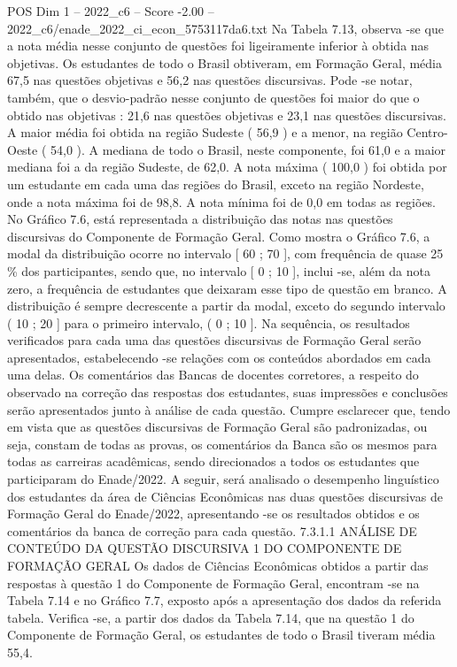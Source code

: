 \begin{textsample}{POS Dim 1 – 2022\_c6 – Score -2.00 – 2022\_c6/enade\_2022\_ci\_econ\_5753117da6.txt}
Na Tabela 7.13, observa -se que a nota média nesse conjunto de questões foi ligeiramente inferior à obtida nas objetivas.
Os estudantes de todo o Brasil obtiveram, em Formação Geral, média 67,5 nas questões objetivas e 56,2 nas questões discursivas.
Pode -se notar, também, que o desvio-padrão nesse conjunto de questões foi maior do que o obtido nas objetivas : 21,6 nas questões objetivas e 23,1 nas questões discursivas.
A maior média foi obtida na região Sudeste ( 56,9 ) e a menor, na região Centro-Oeste ( 54,0 ).
A mediana de todo o Brasil, neste componente, foi 61,0 e a maior mediana foi a da região Sudeste, de 62,0.
A nota máxima ( 100,0 ) foi obtida por um estudante em cada uma das regiões do Brasil, exceto na região Nordeste, onde a nota máxima foi de 98,8.
A nota mínima foi de 0,0 em todas as regiões.
No Gráfico 7.6, está representada a distribuição das notas nas questões discursivas do Componente de Formação Geral.
Como mostra o Gráfico 7.6, a modal da distribuição ocorre no intervalo [ 60 ; 70 ], com frequência de quase 25 \% dos participantes, sendo que, no intervalo [ 0 ; 10 ], inclui -se, além da nota zero, a frequência de estudantes que deixaram esse tipo de questão em branco.
A distribuição é sempre decrescente a partir da modal, exceto do segundo intervalo ( 10 ; 20 ] para o primeiro intervalo, ( 0 ; 10 ].
Na sequência, os resultados verificados para cada uma das questões discursivas de Formação Geral serão apresentados, estabelecendo -se relações com os conteúdos abordados em cada uma delas.
Os comentários das Bancas de docentes corretores, a respeito do observado na correção das respostas dos estudantes, suas impressões e conclusões serão apresentados junto à análise de cada questão.
Cumpre esclarecer que, tendo em vista que as questões discursivas de Formação Geral são padronizadas, ou seja, constam de todas as provas, os comentários da Banca são os mesmos para todas as carreiras acadêmicas, sendo direcionados a todos os estudantes que participaram do Enade/2022.
A seguir, será analisado o desempenho linguístico dos estudantes da área de Ciências Econômicas nas duas questões discursivas de Formação Geral do Enade/2022, apresentando -se os resultados obtidos e os comentários da banca de correção para cada questão. 7.3.1.1 ANÁLISE DE CONTEÚDO DA QUESTÃO DISCURSIVA 1 DO COMPONENTE DE FORMAÇÃO GERAL Os dados de Ciências Econômicas obtidos a partir das respostas à questão 1 do Componente de Formação Geral, encontram -se na Tabela 7.14 e no Gráfico 7.7, exposto após a apresentação dos dados da referida tabela.
Verifica -se, a partir dos dados da Tabela 7.14, que na questão 1 do Componente de Formação Geral, os estudantes de todo o Brasil tiveram média 55,4.

\end{textsample}
